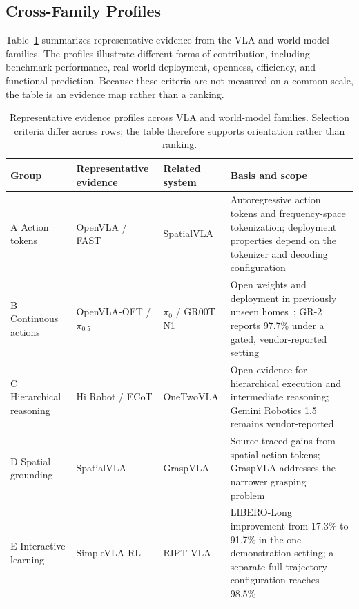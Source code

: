 \documentclass{ieeeaccess}
\begin{document}
\subsection{Cross-Family Profiles}

Table~\ref{tab:verdicts} summarizes representative evidence from the VLA and world-model families. The profiles illustrate different forms of contribution, including benchmark performance, real-world deployment, openness, efficiency, and functional prediction. Because these criteria are not measured on a common scale, the table is an evidence map rather than a ranking.

\begin{table}[!t]
\caption{Representative evidence profiles across VLA and world-model families. Selection criteria differ across rows; the table therefore supports orientation rather than ranking.}
\label{tab:verdicts}
\centering
\scriptsize
\setlength{\tabcolsep}{3.5pt}
\begin{tabular}{p{2.4cm}p{3.0cm}p{2.2cm}p{7.7cm}}
\toprule
Group & Representative evidence & Related system & Basis and scope \\
\midrule
A Action tokens &
\textcolor[RGB]{104,48,148}{OpenVLA / FAST} &
SpatialVLA &
\textcolor[RGB]{104,48,148}{Autoregressive action tokens and frequency-space tokenization; deployment properties depend on the tokenizer and decoding configuration~\cite{openvla,fast}} \\

B Continuous actions &
\textcolor[RGB]{104,48,148}{OpenVLA-OFT / $\pi_{0.5}$} &
$\pi_0$ / GR00T N1 &
Open weights and deployment in previously unseen homes~\cite{pi05}; GR-2 reports 97.7\% under a gated, vendor-reported setting~\cite{gr2} \\

C Hierarchical reasoning &
Hi Robot / ECoT &
OneTwoVLA &
Open evidence for hierarchical execution and intermediate reasoning; Gemini Robotics 1.5 remains vendor-reported~\cite{gemini15} \\

D Spatial grounding &
SpatialVLA &
GraspVLA &
Source-traced gains from spatial action tokens; GraspVLA addresses the narrower grasping problem~\cite{spatialvla} \\

E Interactive learning &
SimpleVLA-RL &
RIPT-VLA &
LIBERO-Long improvement from 17.3\% to 91.7\% in the one-demonstration setting; a separate full-trajectory configuration reaches 98.5\%~\cite{simplevlarl} \\


\end{tabular}
\end{table}
\end{document}
